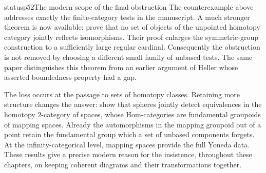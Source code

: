 \begin{dcomment}{status}{p52}{The modern scope of the final obstruction}
The counterexample above addresses exactly the finite-category tests in the manuscript. A much stronger theorem is now available: \citet[Theorem~2.1]{ArlinChristensen2023} prove that no set of objects of the unpointed homotopy category jointly reflects isomorphisms. Their proof enlarges the symmetric-group construction to a sufficiently large regular cardinal. Consequently the obstruction is not removed by choosing a different small family of unbased tests. The same paper distinguishes this theorem from an earlier argument of Heller whose asserted boundedness property had a gap.

The loss occurs at the passage to sets of homotopy classes. Retaining more structure changes the answer: \citet[Theorem~4.3]{ArlinChristensen2023} show that spheres jointly detect equivalences in the homotopy $2$-category of spaces, whose Hom-categories are fundamental groupoids of mapping spaces. Already the automorphisms in the mapping groupoid out of a point retain the fundamental group which a set of unbased components forgets. At the infinity-categorical level, mapping spaces provide the full Yoneda data. These results give a precise modern reason for the insistence, throughout these chapters, on keeping coherent diagrams and their transformations together.
\end{dcomment}
